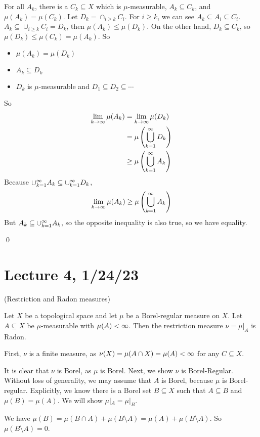 \documentclass[x11names,reqno,14pt]{extarticle}
\newcommand{\seq}[2][\oo]{_{#2 = 1}^#1}
\newcommand{\cupk}[1][\oo]{\cup\seq[#1]{k}}
\newcommand{\bigcupk}[1][\oo]{\bigcup\seq[#1]{k}}
\begin{document}
For all $A_k$, there is a $C_k\subseteq X$ which is $\mu$-measurable, $A_k \subseteq C_k$, and $\mu(A_k) = \mu(C_k)$. Let $D_k = \cap_{i\geq k}C_i$. For $i \geq k$, we can see $A_k \subseteq A_i \subseteq C_i$. $A_k \subseteq \cup_{i\geq k}C_i = D_k$, then $\mu(A_k)\leq\mu(D_k)$. On the other hand, $D_k\subseteq C_k$, so $\mu(D_k)\leq\mu(C_k) = \mu(A_k)$. So
\begin{itemize}
\item $\mu(A_k) = \mu(D_k)$ 
\item $A_k \subseteq D_k$ 
\item $D_k$ is $\mu$-measurable and $D_1 \subseteq D_2 \subseteq \cdots $
\end{itemize}
So
\begin{align*}
\lim_{k\to\oo}\mu(A_k) & = \lim_{k\to\oo}\mu(D_k) \\
						      & = \mu\left(\bigcupk D_k\right) \\
								& \geq \mu\left(\bigcupk A_k\right) \\
\end{align*}
Because $\cupk A_k \subseteq \cupk D_k$, 
\[
\lim_{k\to\oo}\mu(A_k)\geq\mu\left(\bigcupk A_k\right) 
\]
But $A_k \subseteq \cupk A_k$, so the opposite inequality is also true, so we have equality. 

\qed

\section*{Lecture 4, 1/24/23}

\thm (Restriction and Radon measures)

Let $X$ be a topological space and let $\mu$ be a Borel-regular measure on $X$. Let $A \subseteq X$ be $\mu$-measurable with $\mu(A)<\infty$. Then the restriction measure $\nu = \mu|_A$ is Radon. 

\proof

First, $\nu$ is a finite measure, as $\nu(X) = \mu(A \cap X) = \mu(A) < \infty$ for any $C \subseteq X$. 

It is clear that $\nu$ is Borel, as $\mu$ is Borel. Next, we show $\nu$ is Borel-Regular. Without loss of generality, we may assume that $A$ is Borel, because $\mu$ is Borel-regular. Explicitly, we know there is a Borel set $B \subseteq X$ such that $A \subseteq B$ and $\mu(B) = \mu(A)$. We will show $\mu|_A = \mu|_B$. 

We have $\mu(B) = \mu(B \cap A) + \mu(B \setminus A) = \mu(A) + \mu(B \setminus A)$. So $\mu(B\setminus A) = 0$. 
\end{document}
